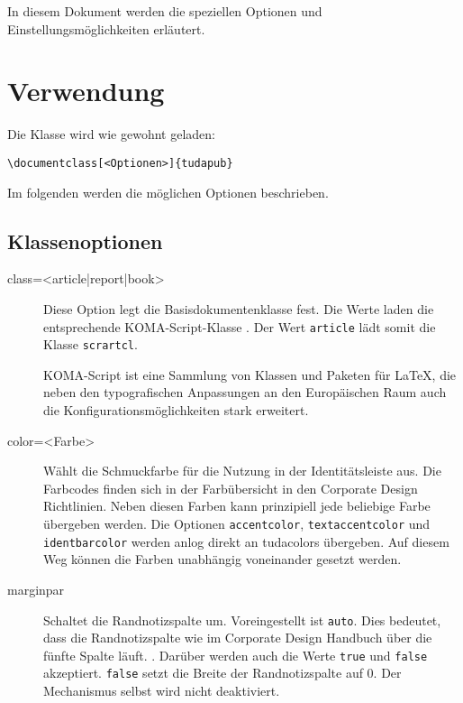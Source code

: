 \documentclass[
	ngerman,
	accentcolor=9c,%
	]{tudapub}
\let\code\texttt
\let\pck\textsf
\begin{document}
In diesem Dokument werden die speziellen Optionen und Einstellungsmöglichkeiten erläutert.

\section{Verwendung}
Die Klasse wird wie gewohnt geladen:
\begin{verbatim}
\documentclass[<Optionen>]{tudapub}
\end{verbatim}
Im folgenden werden die möglichen Optionen beschrieben.

\subsection{Klassenoptionen}

\begin{description}
	\item[class=<article|report|book>] Diese Option legt die Basisdokumentenklasse fest. Die Werte laden die entsprechende KOMA-Script-Klasse \cite{scrguide}. Der Wert \code{article} lädt somit die Klasse \code{scrartcl}.

	KOMA-Script ist eine Sammlung von Klassen und Paketen für \LaTeX, die neben den typografischen Anpassungen an den Europäischen Raum auch die Konfigurationsmöglichkeiten stark erweitert.
	\item[color=<Farbe>] Wählt die Schmuckfarbe für die Nutzung in der Identitätsleiste aus. Die Farbcodes finden sich in der Farbübersicht in den Corporate Design Richtlinien. Neben diesen Farben kann prinzipiell jede beliebige Farbe übergeben werden. Die Optionen \code{accentcolor}, \code{textaccentcolor} und \code{identbarcolor} werden anlog direkt an \pck{tudacolors} übergeben. Auf diesem Weg können die Farben unabhängig voneinander gesetzt werden.
	\item[marginpar] Schaltet die Randnotizspalte um. Voreingestellt ist \code{auto}. Dies bedeutet, dass die Randnotizspalte wie im Corporate Design Handbuch \cite{TUDaGuideline} über die fünfte Spalte läuft.  .
	Darüber werden auch die Werte \code{true} und \code{false} akzeptiert. \code{false} setzt die Breite der Randnotizspalte auf 0. Der Mechanismus selbst wird nicht deaktiviert.


\end{description}
\end{document}
